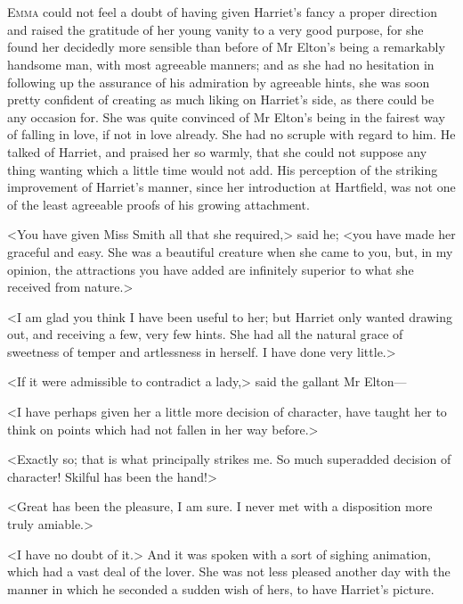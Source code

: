 \chapter[Chapter \thechapter]{}
\lettrine[lraise=0.3]{E}{mma} could not feel a doubt of having given Harriet's fancy a proper direction and raised the gratitude of her young vanity to a very good purpose, for she found her decidedly more sensible than before of Mr Elton's being a remarkably handsome man, with most agreeable manners; and as she had no hesitation in following up the assurance of his admiration by agreeable hints, she was soon pretty confident of creating as much liking on Harriet's side, as there could be any occasion for. She was quite convinced of Mr Elton's being in the fairest way of falling in love, if not in love already. She had no scruple with regard to him. He talked of Harriet, and praised her so warmly, that she could not suppose any thing wanting which a little time would not add. His perception of the striking improvement of Harriet's manner, since her introduction at Hartfield, was not one of the least agreeable proofs of his growing attachment.

<You have given Miss Smith all that she required,> said he; <you have made her graceful and easy. She was a beautiful creature when she came to you, but, in my opinion, the attractions you have added are infinitely superior to what she received from nature.>

<I am glad you think I have been useful to her; but Harriet only wanted drawing out, and receiving a few, very few hints. She had all the natural grace of sweetness of temper and artlessness in herself. I have done very little.>

<If it were admissible to contradict a lady,> said the gallant Mr Elton—

<I have perhaps given her a little more decision of character, have taught her to think on points which had not fallen in her way before.>

<Exactly so; that is what principally strikes me. So much superadded decision of character! Skilful has been the hand!>

<Great has been the pleasure, I am sure. I never met with a disposition more truly amiable.>

<I have no doubt of it.> And it was spoken with a sort of sighing animation, which had a vast deal of the lover. She was not less pleased another day with the manner in which he seconded a sudden wish of hers, to have Harriet's picture.

